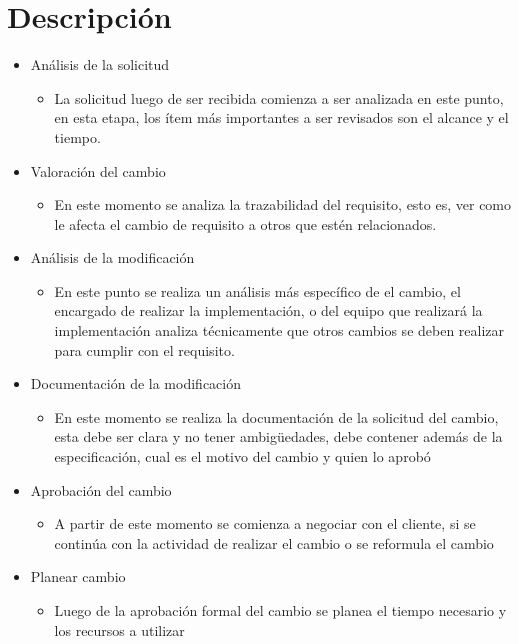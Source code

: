 \section{Descripción}
\begin{itemize}
    \item Análisis de la solicitud
    \begin{itemize}
        \item La solicitud luego de ser recibida comienza a ser analizada en este punto, en esta etapa, los ítem más importantes a ser revisados son el alcance y el tiempo.
    \end{itemize}
    \item Valoración del cambio
    \begin{itemize}
        \item En este momento se analiza la trazabilidad del requisito, esto es, ver como le afecta el cambio de requisito a otros que estén relacionados.
    \end{itemize}
    \item Análisis de la modificación
    \begin{itemize}
        \item En este punto se realiza un análisis más específico de el cambio, el encargado de realizar la implementación, o del equipo que realizará la implementación analiza técnicamente que otros cambios se deben realizar para cumplir con el requisito.
    \end{itemize}
    \item Documentación de la modificación
    \begin{itemize}
        \item En este momento se realiza la documentación de la solicitud del cambio, esta debe ser clara y no tener ambigüedades, debe contener además de la especificación, cual es el motivo del cambio y quien lo aprobó
    \end{itemize}
    \item Aprobación del cambio
    \begin{itemize}
        \item A partir de este momento se comienza a negociar con el cliente, si se continúa con la actividad de realizar el cambio o se reformula el cambio
    \end{itemize}
    \item Planear cambio
    \begin{itemize}
        \item Luego de la aprobación formal del cambio se planea el tiempo necesario y los recursos a utilizar

\end{itemize}
\end{itemize}
